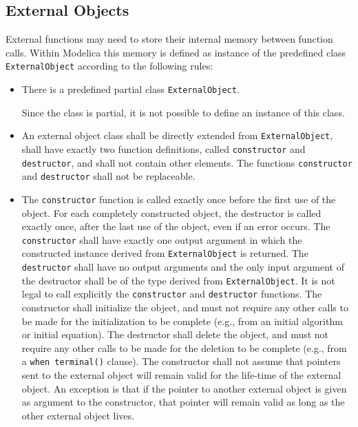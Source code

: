 \subsection{External Objects}\label{external-objects}

External functions may need to store their internal memory between function calls.
Within Modelica this memory is defined as instance of the predefined class \lstinline!ExternalObject! according to the following rules:
\begin{itemize}
\item
  There is a predefined partial class \lstinline!ExternalObject!.
  \begin{nonnormative}
  Since the class is partial, it is not possible to define an instance of this class.
  \end{nonnormative}
\item
  An external object class shall be directly extended from
  \lstinline!ExternalObject!, shall have exactly two function definitions, called
  \lstinline!constructor! and \lstinline!destructor!, and shall not contain other elements.
  The functions \lstinline!constructor! and \lstinline!destructor! shall not be replaceable.
\item
  The \lstinline!constructor! function is called exactly once before the first use
  of the object. For each completely constructed object, the destructor
  is called exactly once, after the last use of the object, even if an
  error occurs. The \lstinline!constructor! shall have exactly one output argument
  in which the constructed instance derived from \lstinline!ExternalObject! is
  returned. The \lstinline!destructor! shall have no output arguments and the only
  input argument of the destructor shall be of the type derived from
  \lstinline!ExternalObject!. It is not legal to call explicitly the \lstinline!constructor! and
  \lstinline!destructor! functions. The constructor shall initialize the object, and
  must not require any other calls to be made for the initialization to
  be complete (e.g., from an initial algorithm or initial equation). The
  destructor shall delete the object, and must not require any other
  calls to be made for the deletion to be complete (e.g., from a \lstinline!when terminal()! clause). The constructor shall not assume that pointers sent
  to the external object will remain valid for the life-time of the external object.  An exception is that if the pointer to another external object is
  given as argument to the constructor, that pointer will remain valid as long as the other external object lives.

\end{itemize}
